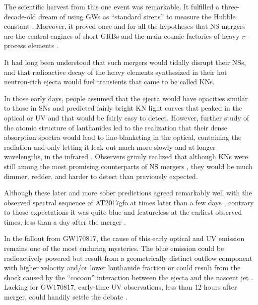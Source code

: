 \documentclass[twocolumn,times]{aastex631}
\begin{document}
The scientific harvest from this one event was remarkable. It fulfilled a three-decade-old dream of using \acp{GW} as ``standard sirens'' to measure the Hubble constant \citep{1986Natur.323..310S,2017Natur.551...85A}. Moreover, it proved once and for all the hypotheses that \ac{NS} mergers are the central engines of short \acp{GRB} \citep{2013ApJ...776...18F} and the main cosmic factories of heavy $r$-process elements \citep{1999ApJ...525L.121F}. 

It had long been understood that such mergers would tidally disrupt their \acp{NS}, and that radioactive decay of the heavy elements synthesized in their hot neutron-rich ejecta would fuel transients \citep{1974ApJ...192L.145L,1989Natur.340..126E,1998ApJ...507L..59L} that came to be called \acp{KN}.

In those early days, people assumed that the ejecta would have opacities similar to those in \acp{SN} and predicted fairly bright \ac{KN} light curves that peaked in the optical or \ac{UV} and that would be fairly easy to detect. However, further study of the atomic structure of lanthanides led to the realization that their dense absorption spectra would lead to line-blanketing in the optical, containing the radiation and only letting it leak out much more slowly and at longer wavelengths, in the infrared \citep{2013ApJ...774...25K}. Observers grimly realized that although \acp{KN} were still among the most promising counterparts of \ac{NS} mergers \citep{2012ApJ...746...48M}, they would be much dimmer, redder, and harder to detect than previously expected.

Although these later and more sober predictions agreed remarkably well with the observed spectral sequence of AT2017gfo at times later than a few days \citep{2017Natur.551...67P,2017Natur.551...80K,2017ApJ...851L..21V}, contrary to those expectations it was quite blue and featureless at the earliest observed times, less than a day after the merger \citep{2017Sci...358.1574S}.

In the fallout from GW170817, the cause of this early optical and \ac{UV} emission remains one of the most enduring mysteries. The blue emission could be radioactively powered but result from a geometrically distinct outflow component with higher velocity and/or lower lanthanide fraction \citep{2017ApJ...848L..18N} or could result from the shock caused by the ``cocoon'' interaction between the ejecta and the nascent jet \citep{2017Sci...358.1559K,2018MNRAS.479..588G}. Lacking for GW170817, early-time \ac{UV} observations, less than 12 hours after merger, could handily settle the debate \citep{2018ApJ...855L..23A}.
\end{document}
